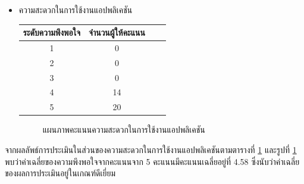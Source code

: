\documentclass[14pt,oneside,openright,a4paper]{cpe-thai-project}
\begin{document}
\begin{itemize}
  \item ความสะดวกในการใช้งานแอปพลิเคชัน
  \begin{table}[!h]
    \centering
    \captionsetup{justification=centering} %
    \begin{tabular}{|c|c|c|c|}
      \hline
      \multicolumn{1}{|c|}{\cellcolor[HTML]{9FC5E8}ระดับความพึงพอใจ} &
        \multicolumn{1}{c|}{\cellcolor[HTML]{9FC5E8}จำนวนผู้ให้คะแนน} \\ \hline
       1 & 0
         \\ \hline 
       2 & 0
         \\ \hline 
       3 & 0
         \\ \hline 
       4 & 14
         \\ \hline 
       5 & 20
         \\ \hline
    \end{tabular}
    \label{tab:Comfortability}
  \end{table}
  \begin{figure}[!h]\centering
    \setlength{\fboxrule}{0.5mm} %
    \setlength{\fboxsep}{0.5cm}
    \caption{แผนภาพคะแนนความสะดวกในการใช้งานแอปพลิเคชัน}\label{fig:Comfortability}
  \end{figure}
\end{itemize}
จากผลลัพธ์การประเมินในส่วนของความสะดวกในการใช้งานแอปพลิเคชันตามตารางที่ \ref{tab:Comfortability} และรูปที่ \ref{fig:Comfortability} พบว่าค่าเฉลี่ยของความพึงพอใจจากคะแนนจาก 5 คะแนนมีคะแนนเฉลี่ยอยู่ที่ 4.58 ซึ่งนับว่าค่าเฉลี่ยของผลการประเมินอยู่ในเกณฑ์ดีเยี่ยม

\newpage
\end{document}
